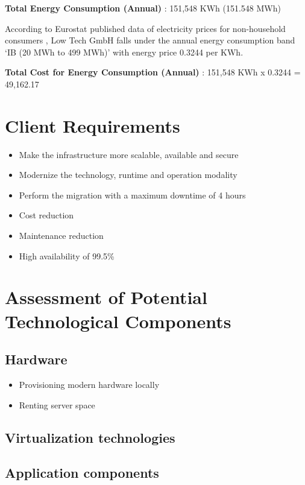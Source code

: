 \documentclass{llncs}
\begin{document}
\textbf{Total Energy Consumption (Annual)} : 151,548 KWh (151.548 MWh)

According to Eurostat published data of electricity prices for non-household consumers \cite{eurostat2023}, Low Tech GmbH falls under the annual energy consumption band 
`IB (20 MWh to 499 MWh)' with energy price 0.3244 \EUR{} per KWh.


\textbf{Total Cost for Energy Consumption (Annual)} : 151,548 KWh x 0.3244 \EUR{} = 49,162.17 \EUR{}

\section{Client Requirements}

\begin{itemize}
  \item Make the infrastructure more scalable, available and secure
  \item Modernize the technology, runtime and operation modality
  \item Perform the migration with a maximum downtime of 4 hours
  \item Cost reduction
  \item Maintenance reduction
  \item High availability of 99.5\%
\end{itemize}

\section{Assessment of Potential Technological Components}

\subsection{Hardware}

\begin{itemize}
  \item Provisioning modern hardware locally
  \item Renting server space
\end{itemize}

\subsection{Virtualization technologies}


\subsection{Application components}
\end{document}
